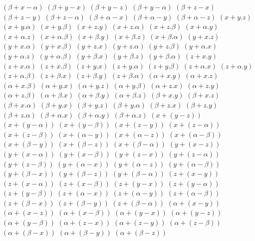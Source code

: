 $ (\beta + x - \alpha) $
$ (\beta + y - x) $
$ (\beta + y - z) $
$ (\beta + y - \alpha) $
$ (\beta + z - x) $
$ (\beta + z - y) $
$ (\beta + z - \alpha) $
$ (\beta + \alpha - x) $
$ (\beta + \alpha - y) $
$ (\beta + \alpha - z) $
$ (x + y . z) $
$ (x + y . \alpha) $
$ (x + y . \beta) $
$ (x + z . y) $
$ (x + z . \alpha) $
$ (x + z . \beta) $
$ (x + \alpha . y) $
$ (x + \alpha . z) $
$ (x + \alpha . \beta) $
$ (x + \beta . y) $
$ (x + \beta . z) $
$ (x + \beta . \alpha) $
$ (y + x . z) $
$ (y + x . \alpha) $
$ (y + x . \beta) $
$ (y + z . x) $
$ (y + z . \alpha) $
$ (y + z . \beta) $
$ (y + \alpha . x) $
$ (y + \alpha . z) $
$ (y + \alpha . \beta) $
$ (y + \beta . x) $
$ (y + \beta . z) $
$ (y + \beta . \alpha) $
$ (z + x . y) $
$ (z + x . \alpha) $
$ (z + x . \beta) $
$ (z + y . x) $
$ (z + y . \alpha) $
$ (z + y . \beta) $
$ (z + \alpha . x) $
$ (z + \alpha . y) $
$ (z + \alpha . \beta) $
$ (z + \beta . x) $
$ (z + \beta . y) $
$ (z + \beta . \alpha) $
$ (\alpha + x . y) $
$ (\alpha + x . z) $
$ (\alpha + x . \beta) $
$ (\alpha + y . x) $
$ (\alpha + y . z) $
$ (\alpha + y . \beta) $
$ (\alpha + z . x) $
$ (\alpha + z . y) $
$ (\alpha + z . \beta) $
$ (\alpha + \beta . x) $
$ (\alpha + \beta . y) $
$ (\alpha + \beta . z) $
$ (\beta + x . y) $
$ (\beta + x . z) $
$ (\beta + x . \alpha) $
$ (\beta + y . x) $
$ (\beta + y . z) $
$ (\beta + y . \alpha) $
$ (\beta + z . x) $
$ (\beta + z . y) $
$ (\beta + z . \alpha) $
$ (\beta + \alpha . x) $
$ (\beta + \alpha . y) $
$ (\beta + \alpha . z) $
$ (x + (y - z)) $
$ (x + (y - \alpha)) $
$ (x + (y - \beta)) $
$ (x + (z - y)) $
$ (x + (z - \alpha)) $
$ (x + (z - \beta)) $
$ (x + (\alpha - y)) $
$ (x + (\alpha - z)) $
$ (x + (\alpha - \beta)) $
$ (x + (\beta - y)) $
$ (x + (\beta - z)) $
$ (x + (\beta - \alpha)) $
$ (y + (x - z)) $
$ (y + (x - \alpha)) $
$ (y + (x - \beta)) $
$ (y + (z - x)) $
$ (y + (z - \alpha)) $
$ (y + (z - \beta)) $
$ (y + (\alpha - x)) $
$ (y + (\alpha - z)) $
$ (y + (\alpha - \beta)) $
$ (y + (\beta - x)) $
$ (y + (\beta - z)) $
$ (y + (\beta - \alpha)) $
$ (z + (x - y)) $
$ (z + (x - \alpha)) $
$ (z + (x - \beta)) $
$ (z + (y - x)) $
$ (z + (y - \alpha)) $
$ (z + (y - \beta)) $
$ (z + (\alpha - x)) $
$ (z + (\alpha - y)) $
$ (z + (\alpha - \beta)) $
$ (z + (\beta - x)) $
$ (z + (\beta - y)) $
$ (z + (\beta - \alpha)) $
$ (\alpha + (x - y)) $
$ (\alpha + (x - z)) $
$ (\alpha + (x - \beta)) $
$ (\alpha + (y - x)) $
$ (\alpha + (y - z)) $
$ (\alpha + (y - \beta)) $
$ (\alpha + (z - x)) $
$ (\alpha + (z - y)) $
$ (\alpha + (z - \beta)) $
$ (\alpha + (\beta - x)) $
$ (\alpha + (\beta - y)) $
$ (\alpha + (\beta - z)) $
